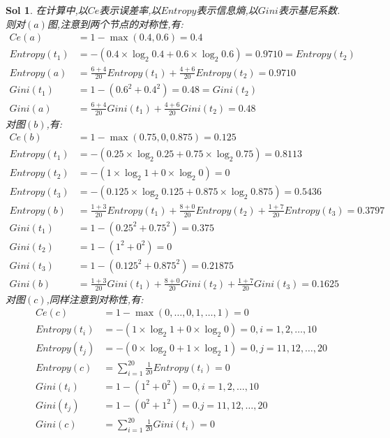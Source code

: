\label{key}\documentclass[UTF8,a4paper,11pt]{ctexart}
\newtheorem{sol}{Sol}[section]
\begin{document}
\begin{sol}
	在计算中,以$Ce$表示误差率,以$Entropy$表示信息熵,以$Gini$表示基尼系数.\\
	则对$(a)$图,注意到两个节点的对称性,有:
	\begin{equation*}
		\begin{split}
			Ce(a)&=1-\max(0.4,0.6)=0.4\\
			Entropy(t_{1})&=-(0.4\times \log_{2}0.4+0.6\times\log_{2}0.6)=0.9710=Entropy(t_{2})\\
			Entropy(a)&=\frac{6+4}{20}Entropy(t_{1})+\frac{4+6}{20}Entropy(t_{2})=0.9710\\
			Gini(t_{1})&=1-(0.6^{2}+0.4^{2})=0.48=Gini(t_{2})\\
			Gini(a)&=\frac{6+4}{20}Gini(t_{1})+\frac{4+6}{20}Gini(t_{2})=0.48
		\end{split}
	\end{equation*}
对图$(b)$,有:
\begin{equation*}
	\begin{split}
		Ce(b)&=1-\max(0.75,0,0.875)=0.125\\
		Entropy(t_{1})&=-(0.25\times\log_{2}0.25+0.75\times\log_{2}0.75)=0.8113\\
		Entropy(t_{2})&=-(1\times\log_{2}1+0\times\log_{2}0)=0\\
		Entropy(t_{3})&=-(0.125\times\log_{2}0.125+0.875\times\log_{2}0.875)=0.5436\\
		Entropy(b)&=\frac{1+3}{20}Entropy(t_{1})+\frac{8+0}{20}Entropy(t_{2})+\frac{1+7}{20}Entropy(t_{3})=0.3797\\
		Gini(t_{1})&=1-(0.25^{2}+0.75^{2})=0.375\\
		Gini(t_{2})&=1-(1^{2}+0^{2})=0\\
		Gini(t_{3})&=1-(0.125^{2}+0.875^{2})=0.21875\\
		Gini(b)&=\frac{1+3}{20}Gini(t_{1})+\frac{8+0}{20}Gini(t_{2})+\frac{1+7}{20}Gini(t_{3})=0.1625
	\end{split}
\end{equation*}
对图$(c)$,同样注意到对称性,有:
\begin{equation*}
	\begin{split}
		Ce(c)&=1-\max(0,\dots,0,1,\dots,1)=0\\
		Entropy(t_{i})&=-(1\times\log_{2}1+0\times\log_{2}0)=0,i=1,2,\dots,10\\
		Entropy(t_{j})&=-(0\times\log_{2}0+1\times\log_{2}1)=0,j=11,12,\dots,20\\
		Entropy(c)&=\sum_{i=1}^{20}\frac{1}{20}Entropy(t_{i})=0\\
		Gini(t_{i})&=1-(1^{2}+0^{2})=0,i=1,2,\dots,10\\
		Gini(t_{j})&=1-(0^{2}+1^{2})=0.j=11,12,\dots,20\\
		Gini(c)&=\sum_{i=1}^{20}\frac{1}{20}Gini(t_{i})=0
	\end{split}
\end{equation*}
\end{sol}
\end{document}
